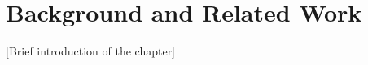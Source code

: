 \chapter{Background and Related Work}
\label{ch:background_and_related_work}

[Brief introduction of the chapter]




